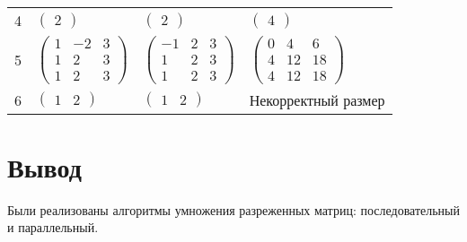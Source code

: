 \begin{table}
\begin{center}
\begin{tabular}{l|l|l|l}
			\vspace{2mm}
			\vspace{2mm}
			4 & $\begin{pmatrix}
				2
			\end{pmatrix}$ &
			$\begin{pmatrix}
				2
			\end{pmatrix}$ &
			$\begin{pmatrix}
				4
			\end{pmatrix}$ \\
			\vspace{2mm}
			\vspace{2mm}
			5 & $\begin{pmatrix}
				1 & -2 & 3\\
				1 & 2 & 3\\
				1 & 2 & 3
			\end{pmatrix}$ &
			$\begin{pmatrix}
				-1 & 2 & 3\\
				1 & 2 & 3\\
				1 & 2 & 3
			\end{pmatrix}$ &
			$\begin{pmatrix}
				0 & 4 & 6\\
				4 & 12 & 18\\
				4 & 12 & 18
			\end{pmatrix}$\\
			\vspace{2mm}
			\vspace{2mm}
			6 & $\begin{pmatrix}
				1 & 2
			\end{pmatrix}$ &
			$\begin{pmatrix}
				1 & 2
			\end{pmatrix}$ &
			Некорректный размер\\
		\end{tabular}
	\label{tbl:functional_test}
	\end{center}
\end{table}

\FloatBarrier


\section*{Вывод}

Были реализованы алгоритмы умножения разреженных матриц: последовательный и параллельный.
